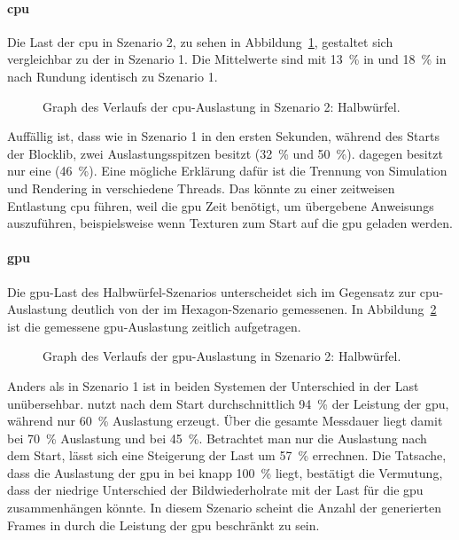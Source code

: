 \paragraph{\ac{cpu}} Die Last der \ac{cpu} in Szenario 2, zu sehen in Abbildung~\ref{fig:seed-0-cube-cpu}, gestaltet sich vergleichbar zu der in Szenario 1. Die Mittelwerte sind mit \SI{13}{\percent} in \sysA{} und \SI{18}{\percent} in \sysB{} nach Rundung identisch zu Szenario 1.
\begin{figure}[!htb]
	\caption[Graph des Verlaufs der -Auslastung in Szenario 2: Halbwürfel.]{Graph des Verlaufs der \ac{cpu}-Auslastung in Szenario 2: Halbwürfel.}\label{fig:seed-0-cube-cpu}
\end{figure}
Auffällig ist, dass \sysB{} wie in Szenario 1 in den ersten Sekunden, während des Starts der Blocklib, zwei Auslastungsspitzen besitzt (\SI{32}{\percent} und \SI{50}{\percent}). \sysA{} dagegen besitzt nur eine (\SI{46}{\percent}). Eine mögliche Erklärung dafür ist die Trennung von Simulation und Rendering in verschiedene Threads. Das könnte zu einer zeitweisen Entlastung \ac{cpu} führen, weil die \ac{gpu} Zeit benötigt, um übergebene \glspl{Anweisung} auszuführen, beispielsweise wenn Texturen zum Start auf die \ac{gpu} geladen werden.

\paragraph{\ac{gpu}} Die \ac{gpu}-Last des Halbwürfel-Szenarios unterscheidet sich im Gegensatz zur \ac{cpu}-Auslastung deutlich von der im Hexagon-Szenario gemessenen. In Abbildung~\ref{fig:seed-0-cube-gpu} ist die gemessene \ac{gpu}-Auslastung zeitlich aufgetragen. 
\begin{figure}[!htb]
	\caption[Graph des Verlaufs der -Auslastung in Szenario 2: Halbwürfel.]{Graph des Verlaufs der \ac{gpu}-Auslastung in Szenario 2: Halbwürfel.}\label{fig:seed-0-cube-gpu}
\end{figure}

Anders als in Szenario 1 ist in beiden Systemen der Unterschied in der Last unübersehbar. \sysB{} nutzt nach dem Start durchschnittlich \SI{94}{\percent} der Leistung der \ac{gpu}, während \sysA{} nur \SI{60}{\percent} Auslastung erzeugt. Über die gesamte Messdauer liegt \sysB{} damit bei \SI{70}{\percent} Auslastung und \sysA{} bei \SI{45}{\percent}. Betrachtet man nur die Auslastung nach dem Start, lässt sich eine Steigerung der Last um \SI{57}{\percent} errechnen. Die Tatsache, dass die Auslastung der \ac{gpu} in \sysB{} bei knapp \SI{100}{\percent} liegt, bestätigt die Vermutung, dass der niedrige Unterschied der Bildwiederholrate mit der Last für die \ac{gpu} zusammenhängen könnte. In diesem Szenario scheint die Anzahl der generierten Frames in \sysB{} durch die Leistung der \ac{gpu} beschränkt zu sein. 


